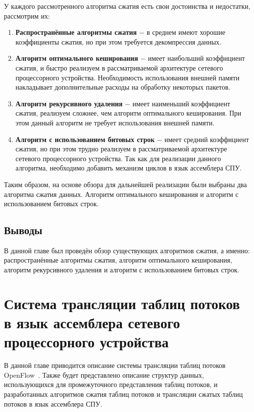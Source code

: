 \documentclass[oneside,final,12pt]{extarticle}
\begin{document}
        У каждого рассмотренного алгоритма сжатия есть свои достоинства и недостатки, рассмотрим их:
        \begin{enumerate}
            \item \textbf{Распространённые алгоритмы сжатия} \(-\) в среднем имеют хорошие коэффициенты сжатия, но при этом требуется декомпрессия данных.
            \item \textbf{Алгоритм оптимального кеширования} \(-\) имеет наибольший коэффициент сжатия, и быстро реализуем в рассматриваемой архитектуре сетевого процессорного устройства. 
                Необходимость использования внешней памяти накладывает дополнительные расходы на обработку некоторых пакетов.
            \item \textbf{Алгоритм рекурсивного удаления} \(-\) имеет наименьший коэффициент сжатия,
                реализуем сложнее, чем алгоритм оптимального кеширования. При этом данный алгоритм не требует использования внешней памяти.
            \item \textbf{Алгоритм с использованием битовых строк} \(-\) имеет средний коэффициент сжатия, 
                но при этом трудно реализуем в рассматриваемой архитектуре сетевого процессорного устройства.
                Так как для реализации данного алгоритма, необходимо добавить механизм циклов в язык ассемблера СПУ.
        \end{enumerate}
        
        Таким образом, на основе обзора для дальнейшей реализации были выбраны два алгоритма сжатия данных. Алгоритм оптимального кеширования и алгоритм с использованием битовых строк.

        \subsection{Выводы}
        В данной главе был проведён обзор существующих алгоритмов сжатия, а именно: распространённые алгоритмы сжатия, алгоритм оптимального кеширования, алгоритм рекурсивного удаления 
        и алгоритм с использованием битовых строк.
    \section{Система трансляции таблиц потоков в язык ассемблера сетевого процессорного устройства}
        \label{sect:trans}
        В данной главе приводится описание системы трансляции таблиц потоков OpenFlow~\cite{andrewmonetec}. Также будет представлено описание
        структур данных, использующихся для промежуточного представления таблиц потоков, и разработанных алгоритмов сжатия таблиц потоков и трансляции
        сжатых таблиц потоков в язык ассемблера СПУ.
\end{document}
